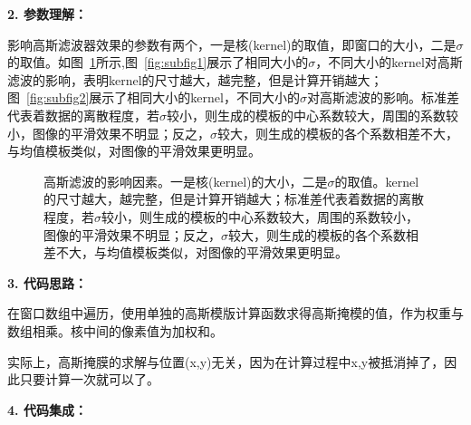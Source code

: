 \documentclass[lang=cn,10pt]{elegantbook}
\begin{document}
\textcolor{third}{\textbf{2. 参数理解：}}

影响高斯滤波器效果的参数有两个，一是核(kernel)的取值，即窗口的大小，二是$\sigma$的取值。如图~\ref{fig:twosubfigures}所示,图~\ref{fig:subfig1}展示了相同大小的$\sigma$，不同大小的kernel对高斯滤波的影响，表明kernel的尺寸越大，越完整，但是计算开销越大；图~\ref{fig:subfig2}展示了相同大小的kernel，不同大小的$\sigma$对高斯滤波的影响。标准差代表着数据的离散程度，若$\sigma$较小，则生成的模板的中心系数较大，周围的系数较小，图像的平滑效果不明显；反之，$\sigma$较大，则生成的模板的各个系数相差不大，与均值模板类似，对图像的平滑效果更明显。


\begin{figure}
  \centering

  \hfill

  \caption{高斯滤波的影响因素。一是核(kernel)的大小，二是$\sigma$的取值。kernel的尺寸越大，越完整，但是计算开销越大；标准差代表着数据的离散程度，若$\sigma$较小，则生成的模板的中心系数较大，周围的系数较小，图像的平滑效果不明显；反之，$\sigma$较大，则生成的模板的各个系数相差不大，与均值模板类似，对图像的平滑效果更明显。}
  \label{fig:twosubfigures}
\end{figure}

\textcolor{third}{\textbf{3. 代码思路：}}

在窗口数组中遍历，使用单独的高斯模版计算函数求得高斯掩模的值，作为权重与数组相乘。核中间的像素值为加权和。

实际上，高斯掩膜的求解与位置(x,y)无关，因为在计算过程中x,y被抵消掉了，因此只要计算一次就可以了。

\textcolor{third}{\textbf{4. 代码集成：}}
\end{document}
